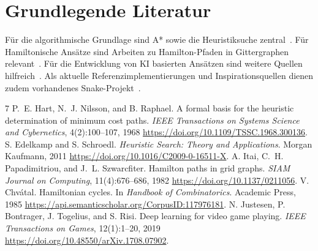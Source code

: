 \documentclass[a4paper]{scrartcl}
\begin{document}
\section{Grundlegende Literatur}
Für die algorithmische Grundlage sind A* sowie die Heuristiksuche zentral~\cite{Hart1968,Edelkamp2011}. Für Hamiltonische Ansätze sind Arbeiten zu Hamilton-Pfaden in Gittergraphen relevant~\cite{Itai1982,Chvatal1985}. Für die Entwicklung von KI basierten Ansätzen sind weitere Quellen hilfreich~\cite{Justesen2019,Togelius2009}. Als aktuelle Referenzimplementierungen und Inspirationsquellen dienen zudem vorhandenes Snake-Projekt~\cite{alphaPhoenix}.

\begin{thebibliography}{7}
 P.~E. Hart, N.~J. Nilsson, and B. Raphael. A formal basis for the heuristic determination of minimum cost paths. \textit{IEEE Transactions on Systems Science and Cybernetics}, 4(2):100--107, 1968 \href{https://doi.org/10.1109/TSSC.1968.300136}{https://doi.org/10.1109/TSSC.1968.300136}.
 S. Edelkamp and S. Schroedl. \textit{Heuristic Search: Theory and Applications}. Morgan Kaufmann, 2011 \href{https://doi.org/10.1016/C2009-0-16511-X}{https://doi.org/10.1016/C2009-0-16511-X}.
 A. Itai, C.~H. Papadimitriou, and J.~L. Szwarcfiter. Hamilton paths in grid graphs. \textit{SIAM Journal on Computing}, 11(4):676--686, 1982 \href{https://doi.org/10.1137/0211056}{https://doi.org/10.1137/0211056}.
 V. Chvátal. Hamiltonian cycles. In \textit{Handbook of Combinatorics}. Academic Press, 1985 \href{https://api.semanticscholar.org/CorpusID:117976181}{https://api.semanticscholar.org/CorpusID:117976181}.
 N. Justesen, P. Bontrager, J. Togelius, and S. Risi. Deep learning for video game playing. \textit{IEEE Transactions on Games}, 12(1):1--20, 2019 \href{https://doi.org/10.48550/arXiv.1708.07902}{https://doi.org/10.48550/arXiv.1708.07902}.

\end{thebibliography}
\end{document}
